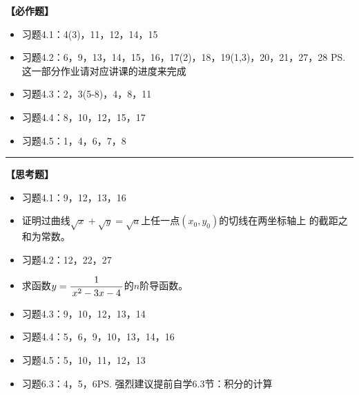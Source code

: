 {\bf 【必作题】}

\begin{itemize}
  \item 习题4.1：4(3)，11，12，14，15
  \item 习题4.2：6，9，13，14，15，16，17(2)，18，19(1,3)，20，21，27，28
  \ps{这一部分作业请对应讲课的进度来完成}
  \item 习题4.3：2，3(5-8)，4，8，11
  \item 习题4.4：8，10，12，15，17
  \item 习题4.5：1，4，6，7，8
\end{itemize}

\bigskip

\hrule

\bigskip
\bigskip

{\bf 【思考题】}

\begin{itemize}
  \item 习题4.1：9，12，13，16
  \item 证明过曲线$\sqrt x+\sqrt y=\sqrt a$上任一点$(x_0,y_0)$的切线在两坐标轴上
		的截距之和为常数。
  \item 习题4.2：12，22，27
  \item 求函数$y=\displaystyle\frac{\,{1}\,}{\,{x^2-3x-4}\,}$的$n$阶导函数。
  \item 习题4.3：9，10，12，13，14
  \item 习题4.4：5，6，9，10，13，14，16
  \item 习题4.5：5，10，11，12，13
  \item 习题6.3：4，5，6\ps{强烈建议提前自学6.3节：积分的计算}
\end{itemize}

\newpage

